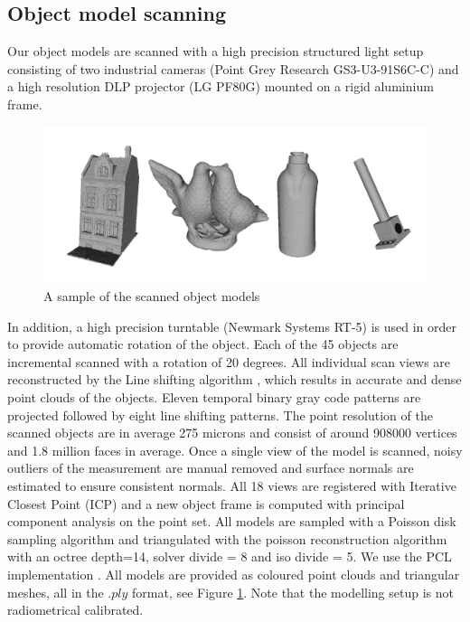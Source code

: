 \documentclass[10pt,twocolumn,letterpaper]{article}
\begin{document}
\subsection{Object model scanning}\label{sec:object_scanning}
Our object models are scanned with a high precision structured light setup consisting of two industrial cameras (Point Grey Research GS3-U3-91S6C-C) and
a high resolution DLP projector (LG PF80G) mounted on a rigid aluminium frame. 
\begin{figure}[htp]
\centering
\includegraphics[clip, trim=1cm 1cm 1cm 1.3cm,width=0.9\linewidth, height= 0.4\linewidth, keepaspectratio]{img/objects/objects.pdf}
\caption{A sample of the scanned object models}
\label{fig:objects}
\end{figure}
In addition, a high precision turntable (Newmark Systems RT-5) is used in order to provide automatic rotation of the object. Each of the 45 objects are incremental scanned with a rotation of 20 degrees. All individual scan views are reconstructed by the Line shifting algorithm \cite{Guehring2000}, which results in accurate and dense point clouds of the objects. Eleven temporal binary gray code patterns are projected followed by eight line shifting patterns. The point resolution of the scanned objects are in average 275 microns and consist of around 908000 vertices and 1.8 million faces in average. Once a single view of the model is scanned, noisy outliers of the measurement are manual removed and surface normals are estimated to ensure consistent normals. All 18 views are registered with Iterative Closest Point (ICP) and a new object frame is computed with principal component analysis on the point set. All models are sampled with a Poisson disk sampling algorithm \cite{Corsini2012} and triangulated with the poisson reconstruction algorithm \cite{Kazhdan2006} with an octree depth=14, solver divide = 8 and iso divide = 5. We use the PCL implementation \cite{RusuCousins2011}. All models are provided as coloured point clouds and triangular meshes, all in the $.ply$ format, see Figure \ref{fig:objects}. Note that the modelling setup is not radiometrical calibrated.
\end{document}
